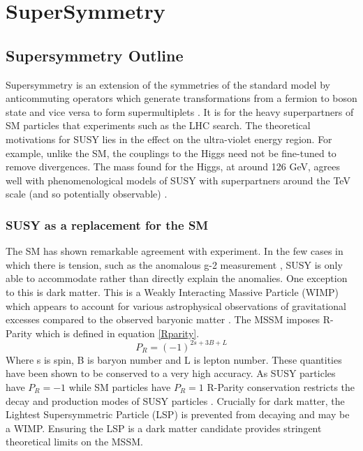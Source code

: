 
\chapter{SuperSymmetry} %

\label{Chapter3} %



\section{Supersymmetry Outline}

Supersymmetry is an extension of the symmetries of the standard model by anticommuting operators which generate transformations from a fermion to boson state and vice versa to form supermultiplets \cite{susyintro}. It is for the heavy superpartners of SM particles that experiments such as the LHC search. The theoretical motivations for SUSY lies in the effect on the ultra-violet energy region. For example, unlike the SM, the couplings to the Higgs need not be fine-tuned to remove divergences. The mass found for the Higgs, at around 126 GeV, agrees well with phenomenological models of SUSY with superpartners around the TeV scale (and so potentially observable) \cite{susyhiggs}. 
\subsection{SUSY as a replacement for the SM}
The SM has shown remarkable agreement with experiment. In the few cases in which there is tension, such as the anomalous g-2 measurement \cite{gm2}, SUSY is only able to accommodate rather than directly explain the anomalies. One exception to this is dark matter. This is a Weakly Interacting Massive Particle (WIMP) which appears to account for various astrophysical observations of gravitational excesses compared to the observed baryonic matter \cite{dm}. The MSSM imposes R-Parity which is defined in equation \ref{Rparity}. 
\begin{equation}
\label{Rparity}
P_R=(-1)^{2s+3B+L}
\end{equation}
Where s is spin, B is baryon number and L is lepton number. These quantities have been shown to be conserved to a very high accuracy. As SUSY particles have $P_R=-1$ while SM particles have $P_R=1$ R-Parity conservation restricts the decay and production modes of SUSY particles \cite{susywimp}. Crucially for dark matter, the Lightest Supersymmetric Particle (LSP) is prevented from decaying and may be a WIMP. Ensuring the LSP is a dark matter candidate provides stringent theoretical limits on the MSSM.

